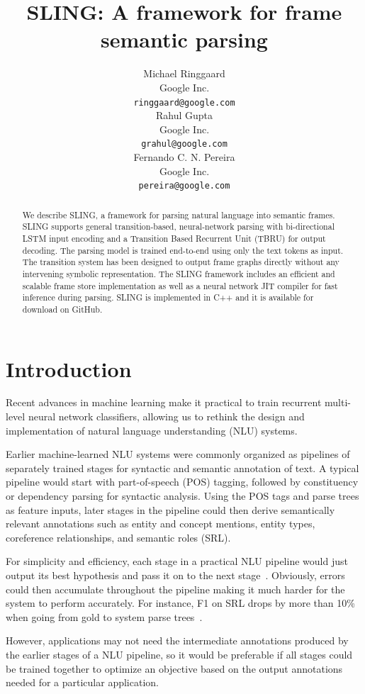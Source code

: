 \documentclass[11pt,a4paper]{article}
\title{SLING: A framework for frame semantic parsing}
\author{
Michael Ringgaard \\ Google Inc. \\ {\tt ringgaard@google.com} \\\And
Rahul Gupta \\ Google Inc. \\ {\tt grahul@google.com} \\\And
Fernando C. N. Pereira \\ Google Inc. \\ {\tt pereira@google.com} \\
}
\begin{document}
\maketitle

\begin{abstract}
We describe SLING, a framework for parsing natural language into
semantic frames. SLING supports general transition-based, neural-network parsing
with bi-directional LSTM input encoding and a Transition Based Recurrent
Unit (TBRU) for output decoding. The parsing model is
trained end-to-end using only the text tokens as input. The
transition system has been designed to output frame graphs directly without
any intervening symbolic representation.
The SLING framework includes an efficient and scalable frame store
implementation as well as a neural network JIT compiler for fast inference
during parsing.
SLING is implemented in C++ and it is available for download on GitHub.
\end{abstract}

\section{Introduction}

Recent advances in machine learning make it practical to train
recurrent multi-level neural network classifiers, allowing us to rethink the
design and implementation of natural language
understanding (NLU) systems.

Earlier machine-learned NLU systems were commonly organized as pipelines of
separately trained stages for syntactic and semantic annotation of text.
A typical  pipeline would start with part-of-speech (POS) tagging, followed by
constituency or dependency parsing for syntactic analysis.
Using the POS tags and parse trees as feature inputs, later stages in the
pipeline could then derive semantically relevant annotations such as entity and
concept mentions, entity types, coreference relationships, and semantic roles
(SRL).

For simplicity and efficiency, each stage in a practical NLU pipeline would just
output its best hypothesis and pass it on to the next stage~\cite{finkel2006}.
Obviously, errors could then accumulate
throughout the pipeline making it much harder for the system to perform
accurately. For instance, F1 on SRL drops by more than 10\% when going from gold
to system parse trees~\cite{toutanova2005}.

However, applications may not need the intermediate annotations produced
by the earlier stages of a NLU pipeline, so it would be preferable if all stages
could be trained together to optimize an objective based on the output
annotations needed for a particular application.
\end{document}
